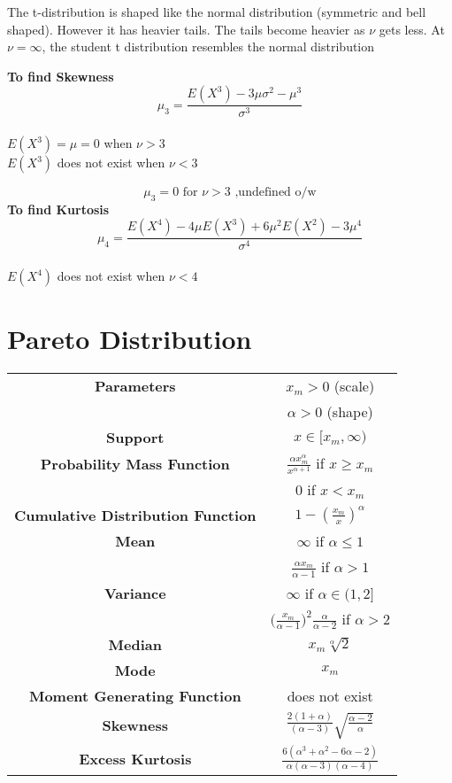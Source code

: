 \documentclass[14pt, a4paper]{article}
\theoremstyle{definition}
\begin{document}
The t-distribution is shaped like the normal distribution (symmetric and bell shaped). However it has heavier tails. The tails become heavier as $\nu$ gets less. At $\nu = \infty$, the student t distribution resembles the normal distribution

\textbf{To find Skewness}
\[ \mu_3= \frac{E(X^3) - 3 \mu \sigma^2 - \mu^3}{ \sigma^3} \]
\\ $E(X^3) = \mu = 0$ when $\nu > 3$
\\ $E(X^3)$ does not exist when $\nu < 3$

\[ \mu_3= 0 \text{ for } \nu > 3 \text{ ,undefined o/w}\]
\textbf{To find Kurtosis}
\[ \mu_4 = \frac{ E(X^4) - 4 \mu E(X^3) + 6 \mu^2 E(X^2) - 3 \mu^4}{ \sigma^4} \]
\\ $E(X^4)$ does not exist when $\nu < 4$



\section{Pareto Distribution}

\begin{tabular}{|c|c|}  %
\hline
 \textbf{Parameters }& $x_m > 0$ (scale) \\ & $\alpha >0$ (shape) \\
 \hline
 \textbf{Support} & $x \in [x_m, \infty)$ \\
 \hline
 \textbf{Probability Mass Function} & $\frac{\alpha x_m^\alpha}{x^{\alpha +1}}$ if $x \geq x_m$ \\ & $0$ if $x < x_m$ \\
 \hline
 \textbf{Cumulative Distribution Function} &  $1 - (\frac{x_m}{x})^\alpha$ \\
 \hline
 \textbf{Mean} & $\infty$ if $\alpha \leq 1$ \\ & $\frac{\alpha x_m}{\alpha - 1}$ if $\alpha > 1$ \\ 
 \hline
 \textbf{Variance} & $\infty$ if $\alpha \in (1,2] $ \\ & $\big( \frac{x_m}{\alpha - 1}\big) ^2 \frac{\alpha}{\alpha - 2}$ if $\alpha > 2$\\
 \hline
 \textbf{Median} & $x_m  \sqrt[\alpha]{2}$ \\ 
 \hline
 \textbf{Mode} & $x_m$\\
 \hline
 \textbf{Moment Generating Function} & does not exist \\
 \hline
 \textbf{Skewness} & $\frac{2(1+\alpha)}{(\alpha - 3)} \sqrt{\frac{\alpha - 2}{\alpha}}$\\
 \hline
 \textbf{Excess Kurtosis} & $\frac{6(\alpha^3 +\alpha^2 - 6\alpha -2 )}{\alpha(\alpha - 3)(\alpha - 4)}$ \\
 \hline
       
  \end{tabular}
\end{document}
